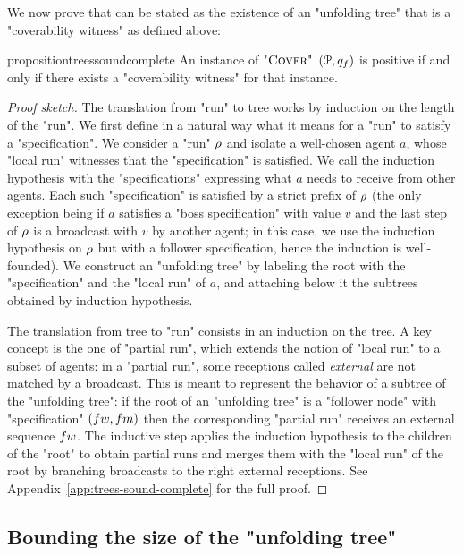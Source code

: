 We now prove that \COVER can be stated as the existence of an "unfolding tree" that is a "coverability witness" as defined above:
\begin{restatable}{proposition}{treessoundcomplete}
\label{prop:trees-sound-complete}
An instance of $\textsc{"Cover"}$ $(\mathcal{P},q_f)$ is positive if and only if there exists a "coverability witness" for that instance.
\end{restatable}
\begin{proof}[Proof sketch]
The translation from "run" to tree works by induction on the length of the "run". We first define in a natural way what it means for a "run" to satisfy a "specification". We consider a "run" $\rho$ and isolate a well-chosen agent $a$, whose "local run" witnesses that the "specification" is satisfied. We call the induction hypothesis with the "specifications" expressing what $a$ needs to receive from other agents. Each such "specification" is satisfied by a strict prefix of $\rho$ (the only exception being if $a$ satisfies a "boss specification" with value $v$ and the last step of $\rho$ is a broadcast with $v$ by another agent; in this case, we use the induction hypothesis on $\rho$ but with a follower specification, hence the induction is well-founded).
We construct an "unfolding tree" by labeling the root with the "specification" and the "local run" of $a$, and attaching below it the subtrees obtained by induction hypothesis.

The translation from tree to "run" consists in an induction on the tree. A key concept is the one of "partial run", which extends the notion of "local run" to a subset of agents: in a "partial run", some receptions called \emph{external} are not matched by a broadcast. This is meant to represent the behavior of a subtree of the "unfolding tree": if the root of an "unfolding tree" is a "follower node" with "specification" $(\followwordspec, \followmessagespec)$ then the corresponding "partial run" receives an external sequence $\followwordspec$. The inductive step applies the induction hypothesis to the children of the "root" to obtain partial runs and merges them with the "local run" of the root by branching broadcasts to the right external receptions. 
See Appendix~\ref{app:trees-sound-complete} for the full proof. 
\end{proof}



\subsection{Bounding the size of the "unfolding tree"}
\label{sec:tree-bounds}

